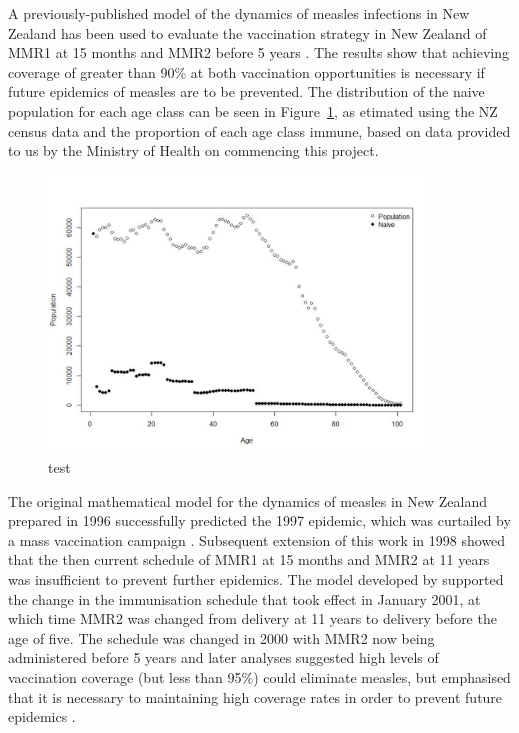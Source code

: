 \documentclass{article}
\begin{document}
A previously-published model of the dynamics of measles infections in New Zealand has been used to evaluate the vaccination strategy in New Zealand of MMR1 at 15 months and MMR2 before 5 years \citep{roberts0,roberts4,tobias98}. The results show that achieving coverage of greater than 90\% at both vaccination opportunities is necessary if future epidemics of measles are to be prevented. The distribution of the naive population for each age class can be seen in Figure~\ref{fig:naive}, as etimated using the NZ census data and the proportion of each age class immune, based on data provided to us by the Ministry of Health on commencing this project.

\begin{figure}
     \centering
     \includegraphics[width=0.9\textwidth]{PopulationNaive.pdf}
     \caption{test}
     \label{fig:naive}
\end{figure}

The original mathematical model for the dynamics of measles in New Zealand prepared in 1996 \citep{tobias98} successfully predicted the 1997 epidemic, which was curtailed by a mass vaccination campaign \citep{mansoor98,roberts0}. Subsequent extension of this work in 1998 showed that the then current schedule of MMR1 at 15 months and MMR2 at 11 years was insufficient to prevent further epidemics. The model developed by \citep{roberts0} supported the change in the immunisation schedule that took effect in January 2001, at which time MMR2 was changed from delivery at 11 years to delivery before the age of five. The schedule was changed in 2000 with MMR2 now being administered before 5 years \citep{anon2a} and later analyses suggested high levels of vaccination coverage (but less than 95\%) could eliminate measles, but emphasised that it is necessary to maintaining high coverage rates in order to prevent future epidemics \citep{roberts4}.
\end{document}
